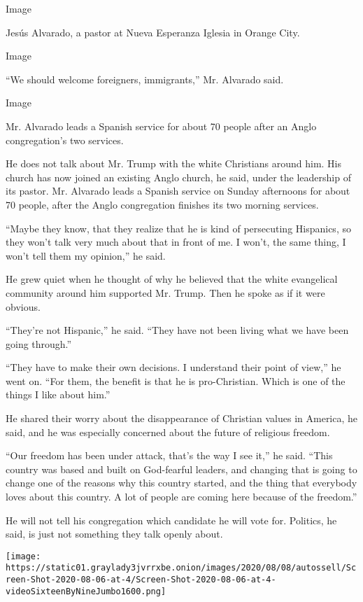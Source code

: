 Image

Jesús Alvarado, a pastor at Nueva Esperanza Iglesia in Orange City.

Image

``We should welcome foreigners, immigrants,'' Mr. Alvarado said.

Image

Mr. Alvarado leads a Spanish service for about 70 people after an Anglo
congregation's two services.

He does not talk about Mr. Trump with the white Christians around him.
His church has now joined an existing Anglo church, he said, under the
leadership of its pastor. Mr. Alvarado leads a Spanish service on Sunday
afternoons for about 70 people, after the Anglo congregation finishes
its two morning services.

``Maybe they know, that they realize that he is kind of persecuting
Hispanics, so they won't talk very much about that in front of me. I
won't, the same thing, I won't tell them my opinion,'' he said.

He grew quiet when he thought of why he believed that the white
evangelical community around him supported Mr. Trump. Then he spoke as
if it were obvious.

``They're not Hispanic,'' he said. ``They have not been living what we
have been going through.''

``They have to make their own decisions. I understand their point of
view,'' he went on. ``For them, the benefit is that he is pro-Christian.
Which is one of the things I like about him.''

He shared their worry about the disappearance of Christian values in
America, he said, and he was especially concerned about the future of
religious freedom.

``Our freedom has been under attack, that's the way I see it,'' he said.
``This country was based and built on God-fearful leaders, and changing
that is going to change one of the reasons why this country started, and
the thing that everybody loves about this country. A lot of people are
coming here because of the freedom.''

He will not tell his congregation which candidate he will vote for.
Politics, he said, is just not something they talk openly about.

\texttt{[image: https://static01.graylady3jvrrxbe.onion/images/2020/08/08/autossell/Screen-Shot-2020-08-06-at-4/Screen-Shot-2020-08-06-at-4-videoSixteenByNineJumbo1600.png]}

